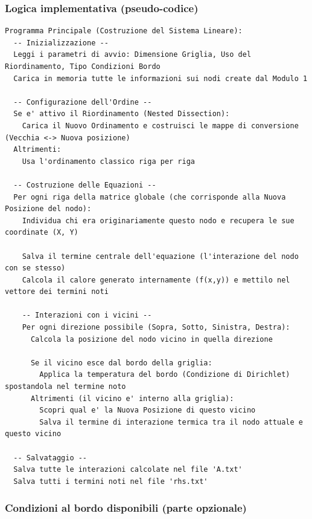 \documentclass[a4paper,12pt]{article}
\begin{document}
\subsubsection*{Logica implementativa (pseudo-codice)}
\begin{minipage}{\linewidth}
\begin{lstlisting}
Programma Principale (Costruzione del Sistema Lineare):
  -- Inizializzazione --
  Leggi i parametri di avvio: Dimensione Griglia, Uso del Riordinamento, Tipo Condizioni Bordo
  Carica in memoria tutte le informazioni sui nodi create dal Modulo 1

  -- Configurazione dell'Ordine --
  Se e' attivo il Riordinamento (Nested Dissection):
    Carica il Nuovo Ordinamento e costruisci le mappe di conversione (Vecchia <-> Nuova posizione)
  Altrimenti:
    Usa l'ordinamento classico riga per riga

  -- Costruzione delle Equazioni --
  Per ogni riga della matrice globale (che corrisponde alla Nuova Posizione del nodo):
    Individua chi era originariamente questo nodo e recupera le sue coordinate (X, Y)
    
    Salva il termine centrale dell'equazione (l'interazione del nodo con se stesso)
    Calcola il calore generato internamente (f(x,y)) e mettilo nel vettore dei termini noti
    
    -- Interazioni con i vicini --
    Per ogni direzione possibile (Sopra, Sotto, Sinistra, Destra):
      Calcola la posizione del nodo vicino in quella direzione
      
      Se il vicino esce dal bordo della griglia:
        Applica la temperatura del bordo (Condizione di Dirichlet) spostandola nel termine noto
      Altrimenti (il vicino e' interno alla griglia):
        Scopri qual e' la Nuova Posizione di questo vicino
        Salva il termine di interazione termica tra il nodo attuale e questo vicino
        
  -- Salvataggio --
  Salva tutte le interazioni calcolate nel file 'A.txt'
  Salva tutti i termini noti nel file 'rhs.txt'
\end{lstlisting}
\end{minipage}

\subsubsection*{Condizioni al bordo disponibili (parte opzionale)}
\end{document}
